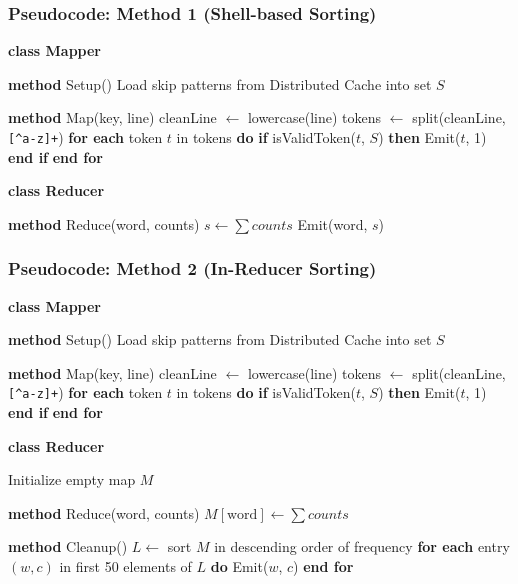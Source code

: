 \documentclass[12pt,a4paper]{article}
\begin{document}
\subsubsection{Pseudocode: Method 1 (Shell-based Sorting)}

\begin{algorithm}
\caption{Top-50 Word Frequency --- Method 1}
\begin{algorithmic}[1]

\State \textbf{class Mapper}

\State \textbf{method} Setup()
\State \quad Load skip patterns from Distributed Cache into set $S$

\State \textbf{method} Map(key, line)
\State \quad cleanLine $\gets$ lowercase(line)
\State \quad tokens $\gets$ split(cleanLine, \verb|[^a-z]+|)
\State \quad \textbf{for each} token $t$ in tokens \textbf{do}
\State \qquad \textbf{if} isValidToken($t$, $S$) \textbf{then}
\State \qquad\qquad Emit($t$, 1)
\State \qquad \textbf{end if}
\State \quad \textbf{end for}

\vspace{0.5em}
\State \textbf{class Reducer}

\State \textbf{method} Reduce(word, counts)
\State \quad $s \gets \sum counts$
\State \quad Emit(word, $s$)

\end{algorithmic}
\end{algorithm}

\subsubsection{Pseudocode: Method 2 (In-Reducer Sorting)}

\begin{algorithm}
\caption{Top-50 Word Frequency --- Method 2 (In-Reducer Sorting)}
\begin{algorithmic}[1]

\State \textbf{class Mapper}

\State \textbf{method} Setup()
\State \quad Load skip patterns from Distributed Cache into set $S$

\State \textbf{method} Map(key, line)
\State \quad cleanLine $\gets$ lowercase(line)
\State \quad tokens $\gets$ split(cleanLine, \verb|[^a-z]+|)
\State \quad \textbf{for each} token $t$ in tokens \textbf{do}
\State \qquad \textbf{if} isValidToken($t$, $S$) \textbf{then}
\State \qquad\qquad Emit($t$, 1)
\State \qquad \textbf{end if}
\State \quad \textbf{end for}

\vspace{0.5em}
\State \textbf{class Reducer}

\State \quad Initialize empty map $M$

\State \textbf{method} Reduce(word, counts)
\State \quad $M[\text{word}] \gets \sum counts$

\State \textbf{method} Cleanup()
\State \quad $L \gets$ sort $M$ in descending order of frequency
\State \quad \textbf{for each} entry $(w, c)$ in first 50 elements of $L$ \textbf{do}
\State \qquad Emit($w$, $c$)
\State \quad \textbf{end for}

\end{algorithmic}
\end{algorithm}
\end{document}
